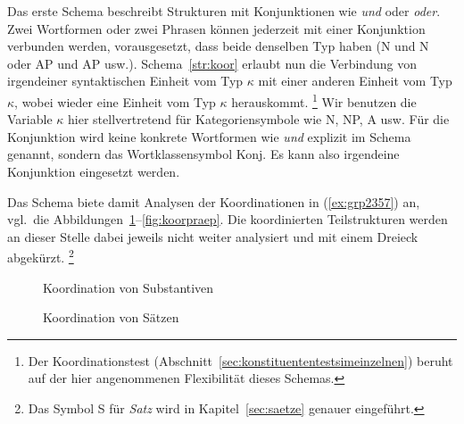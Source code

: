 Das erste Schema beschreibt Strukturen mit Konjunktionen wie \textit{und} oder \textit{oder}.
Zwei Wortformen oder zwei Phrasen können jederzeit mit einer Konjunktion verbunden werden, vorausgesetzt, dass beide denselben Typ haben (N und N oder AP und AP usw.).
Schema~\ref{str:koor} erlaubt nun die Verbindung von irgendeiner syntaktischen Einheit vom Typ $\kappa$ mit einer anderen Einheit vom Typ $\kappa$, wobei wieder eine Einheit vom Typ $\kappa$ herauskommt.%
\footnote{Der Koordinationstest (Abschnitt~\ref{sec:konstituententestsimeinzelnen}) beruht auf der hier angenommenen Flexibilität dieses Schemas.}
Wir benutzen die Variable $\kappa$ hier stellvertretend für Kategoriensymbole wie N, NP, A usw.
Für die Konjunktion wird keine konkrete Wortformen wie \textit{und} explizit im Schema genannt, sondern das Wortklassensymbol Konj.
Es kann also irgendeine Konjunktion eingesetzt werden.


Das Schema biete damit Analysen der Koordinationen in (\ref{ex:grp2357}) an, vgl.\ die Abbildungen~\ref{fig:koorsubst}--\ref{fig:koorpraep}.
Die koordinierten Teilstrukturen werden an dieser Stelle dabei jeweils nicht weiter analysiert und mit einem Dreieck abgekürzt.%
\footnote{Das Symbol S für \textit{Satz} wird in Kapitel~\ref{sec:saetze} genauer eingeführt.}

\begin{exe}
  \ex\label{ex:grp2357}
  \begin{xlist}
  \end{xlist}
\end{exe}

\begin{figure}[!htbp]
  \centering
  \caption{Koordination von Substantiven}
  \label{fig:koorsubst}
\end{figure}

\begin{figure}[!htbp]
  \centering
  \caption{Koordination von Sätzen}
  \label{fig:koorsatz}
\end{figure}

